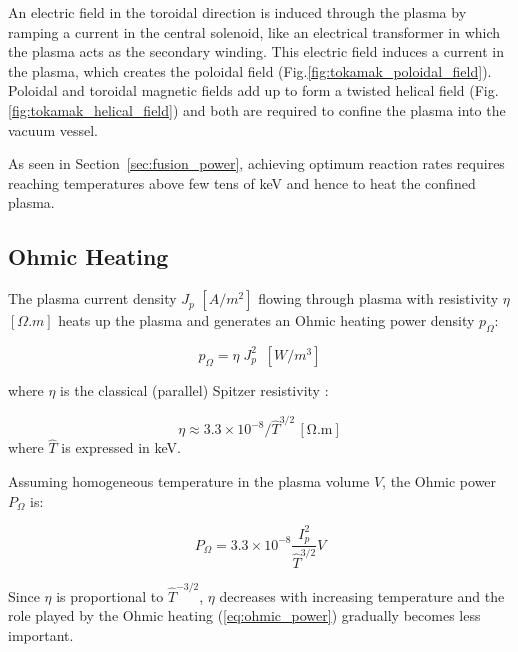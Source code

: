 An electric field in the toroidal direction is induced through the plasma by ramping a current in the central solenoid, like an electrical transformer in which the plasma acts as the secondary winding. This electric field induces a current in the plasma, which creates the poloidal field (Fig.\ref{fig:tokamak_poloidal_field}). Poloidal and toroidal magnetic fields add up to form a twisted helical field (Fig.\ref{fig:tokamak_helical_field}) and both are required to confine the plasma into the vacuum vessel. 

As seen in Section~\ref{sec:fusion_power}, achieving optimum reaction rates requires reaching temperatures above few tens of \si{keV} and hence to heat the confined plasma.


\subsection{Ohmic Heating}
The plasma current density $J_p$ $[\si{A/m^2}]$ flowing through plasma with resistivity $\eta$ $[\si{\Omega.m}]$ heats up the plasma and generates an Ohmic heating power density $p_\Omega$:

\begin{equation}\label{eq:ohmic_power_density}
p_\Omega = \eta \; J_p^2 \;\; \si{[W/m^3]}
\end{equation}

where $\eta$ is the classical (parallel) Spitzer resistivity \cite[Eq.(11.15)]{Freidberg2007}:

\begin{equation}\label{eq:Spitzer_resistivity}
\eta
\approx
3.3 \times 10^{-8} / \hat T^{3/2}  \, \mathrm{[\Omega.m]}
\end{equation}
where $\hat T$ is expressed in \si{keV}.

Assuming homogeneous temperature in the plasma volume $V$, the Ohmic power $P_\Omega$ is:

\begin{equation}\label{eq:ohmic_power}
P_\Omega
=
3.3 \times 10^{-8} \frac{ I_p^2 }{ \hat T^{3/2} } V
\end{equation}

Since $\eta$ is proportional to $\hat T^{-3/2}$, $\eta$ decreases with increasing temperature and the role played by the Ohmic heating (\ref{eq:ohmic_power}) gradually becomes less important. 


